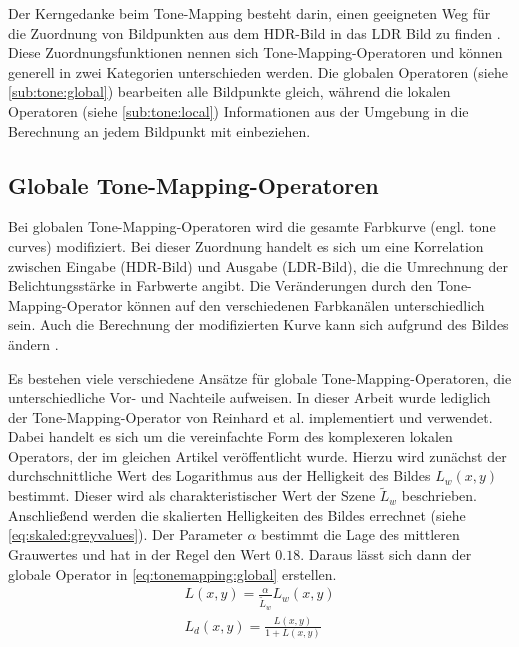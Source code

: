  Der Kerngedanke beim \gls{Tone-Mapping} besteht darin, einen geeigneten Weg für die Zuordnung von Bildpunkten aus dem \gls{HDR}-Bild in das \gls{LDR} Bild zu finden \cite[S. 145]{Bloch2012}. Diese Zuordnungsfunktionen nennen sich \gls{Tone-Mapping}-Operatoren und können generell in zwei Kategorien unterschieden werden. Die globalen Operatoren (siehe \autoref{sub:tone:global}) bearbeiten alle Bildpunkte gleich, während die lokalen Operatoren (siehe \autoref{sub:tone:local}) Informationen aus der Umgebung in die Berechnung an jedem Bildpunkt mit einbeziehen.
 

 \subsection{Globale \gls{Tone-Mapping}-Operatoren}
\label{sub:tone:global}
Bei globalen \gls{Tone-Mapping}-Operatoren wird die gesamte Farbkurve (engl. tone curves) modifiziert. Bei dieser Zuordnung handelt es sich um eine Korrelation zwischen Eingabe (\gls{HDR}-Bild) und Ausgabe (\gls{LDR}-Bild), die die Umrechnung der Belichtungsstärke in Farbwerte angibt. Die Veränderungen durch den \gls{Tone-Mapping}-Operator können auf den verschiedenen Farbkanälen unterschiedlich sein. Auch die Berechnung der modifizierten Kurve kann sich aufgrund des Bildes ändern \cite[S. 146]{Bloch2012}. 

Es bestehen viele verschiedene Ansätze für globale \gls{Tone-Mapping}-Operatoren, die unterschiedliche Vor- und Nachteile aufweisen.
In dieser Arbeit wurde lediglich der \gls{Tone-Mapping}-Operator von Reinhard et al. \cite{ReinhardToneMapper} implementiert und verwendet. Dabei handelt es sich um die vereinfachte Form des komplexeren lokalen Operators, der im gleichen Artikel veröffentlicht wurde.
Hierzu wird zunächst der durchschnittliche Wert des Logarithmus aus der Helligkeit des Bildes $L_w(x,y)$ bestimmt. Dieser wird als charakteristischer Wert der Szene $\tilde{L}_w$ beschrieben. Anschließend werden die skalierten Helligkeiten des Bildes errechnet (siehe \autoref{eq:skaled:greyvalues}). Der Parameter $\alpha$ bestimmt die Lage des mittleren Grauwertes und hat in der Regel den Wert $0.18$. Daraus lässt sich dann der globale Operator in \autoref{eq:tonemapping:global} erstellen.
\begin{align}
\label{eq:skaled:greyvalues}
L(x,y) = \frac{\alpha}{\tilde{L}_w} L_w(x,y)\\
\label{eq:tonemapping:global}
L_d(x, y) =\frac{L(x,y)}{1+ L(x,y)}
\end{align}


